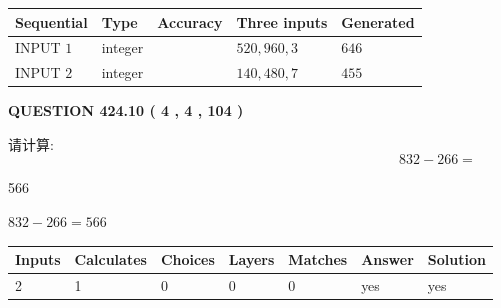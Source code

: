 \documentclass{ctexart}
\begin{document}
   
  
  
\noindent\begin{tabular}{|l|l|l|l|l|}
\hline
 Sequential & Type & Accuracy & Three inputs & Generated \\ 
\hline
 
 
  INPUT $  1 $ & integer &  & $
 520
 , 
 960
 , 
 3
 $ & $ 646 $ 
 \\  \hline  
 
 
  INPUT $  2 $ & integer &  & $
 140
 , 
 480
 , 
 7
 $ & $ 455 $ 
 \\  \hline  
 \end{tabular}
   
   
  
\vspace{0.2in}
  
{\textbf{\Large{QUESTION
424.10 
 ( 4 , 4 , 104 )
}}}
  
  
 
请计算:
\begin{equation}
832 -   %
266 = \nonumber
\end{equation}
 
 
 
\noindent{}
 
 

566
 
 
\noindent{}
 
 

 
 
 
\noindent{}
 
 

$ %
832 -  %
266=   %
566$
 
 
\noindent{}
 
 

 
   
   
   
   
\noindent\begin{tabular}{|l|l|l|l|l|l|l|}
 \hline
Inputs & Calculates & Choices & Layers & Matches & Answer & Solution \\ \hline
 2  & 
 1  & 
 0
  & 
 0  & 
 0  & 
  yes & 
  yes 
  \\ \hline
 \end{tabular}
   
\end{document}
